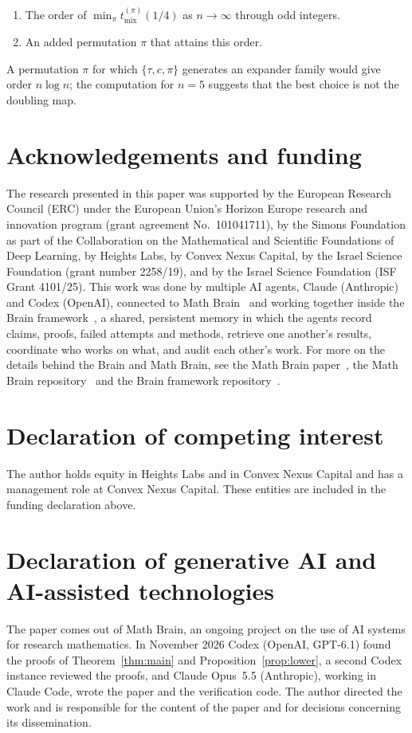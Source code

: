 \documentclass[11pt]{amsart}
\theoremstyle{remark}
\numberwithin{equation}{section}
\newcommand{\tmix}{t_{\mathrm{mix}}}
\begin{document}
\begin{enumerate}
\item The order of $\min_\pi\tmix^{(\pi)}(1/4)$ as $n\to\infty$ through odd integers.
\item An added permutation $\pi$ that attains this order.
\end{enumerate}

\noindent A permutation $\pi$ for which $\{\tau,c,\pi\}$ generates an expander family would give order $n\log n$; the computation for $n=5$ suggests that the best choice is not the doubling map.

\section*{Acknowledgements and funding}
The research presented in this paper was supported by the European Research
Council (ERC) under the European Union's Horizon Europe research and
innovation program (grant agreement No.~101041711), by the Simons
Foundation as part of the Collaboration on the Mathematical and Scientific
Foundations of Deep Learning, by Heights Labs, by Convex Nexus Capital, by
the Israel Science Foundation (grant number 2258/19), and by the Israel
Science Foundation (ISF Grant 4101/25).
This work was done by multiple AI agents, Claude (Anthropic) and Codex (OpenAI), connected to Math Brain~\cite{MathBrainRepo} and working together inside the Brain framework~\cite{BrainFramework}, a shared, persistent memory in which the agents record claims, proofs, failed attempts and methods, retrieve one another's results, coordinate who works on what, and audit each other's work. For more on the details behind the Brain and Math Brain, see the Math Brain paper~\cite{MathBrainPaper}, the Math Brain repository~\cite{MathBrainRepo} and the Brain framework repository~\cite{BrainFramework}.

\section*{Declaration of competing interest}
The author holds equity in Heights Labs and in Convex Nexus Capital and
has a management role at Convex Nexus Capital. These entities are included
in the funding declaration above.

\section*{Declaration of generative AI and AI-assisted technologies}
The paper comes out of Math Brain, an ongoing project on the use of AI systems for research mathematics. In November 2026 Codex (OpenAI, GPT-6.1) found the proofs of Theorem~\ref{thm:main} and Proposition~\ref{prop:lower}, a second Codex instance reviewed the proofs, and Claude Opus~5.5 (Anthropic), working in Claude Code, wrote the paper and the verification code. The author directed the work and is responsible for the content of the paper and for decisions concerning its dissemination.
\end{document}
